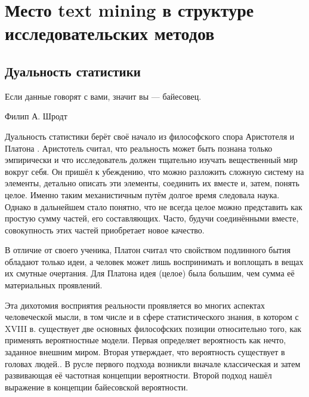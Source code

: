 \chapter{Место text mining в структуре исследовательских методов} \label{chapt1}
\section{Дуальность статистики} \label{sect1_1}
\epigraph{Если данные говорят с вами, значит вы --- байесовец.}{Филип А. Шродт \cite[стр. 11]{Schrodt2010}} 
Дуальность статистики берёт своё начало из философского спора Аристотеля и Платона \cite[стр. 7]{handbook_stat_dm}. Аристотель считал, что реальность может быть познана только эмпирически и что исследователь должен тщательно изучать вещественный мир вокруг себя. Он пришёл к убеждению, что можно разложить сложную систему на элементы, детально описать эти элементы, соединить их вместе и, затем, понять целое. Именно таким механистичным путём долгое время следовала наука. Однако в дальнейшем стало понятно, что не всегда целое можно представить как простую сумму частей, его составляющих. Часто, будучи соединёнными вместе, совокупность этих частей приобретает новое качество.

В отличие от своего ученика, Платон считал что свойством подлинного бытия обладают только идеи, а человек может лишь воспринимать и воплощать в вещах их смутные очертания. Для Платона идея (целое) была большим, чем сумма её материальных проявлений.

Эта дихотомия восприятия реальности проявляется во многих аспектах человеческой мысли, в том числе и в сфере статистического знания, в котором с XVIII в. существует две основных философских позиции относительно того, как применять вероятностные модели. Первая определяет вероятность как нечто, заданное внешним миром. Вторая утверждает, что вероятность существует в головах людей.\cite[стр. 18]{Gaul2012}. В русле первого подхода возникли вначале классическая и затем развивающая её частотная концепции вероятности. Второй подход нашёл выражение в концепции байесовской вероятности.

